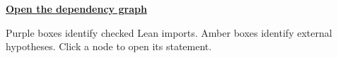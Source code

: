 \documentclass[11pt]{article}
\begin{document}
\maketitle
\noindent\href{dependency-graph.svg}{\textbf{Open the dependency graph}}\par
Purple boxes identify checked Lean imports. Amber boxes identify
external hypotheses. Click a node to open its statement.
\tableofcontents

\end{document}
